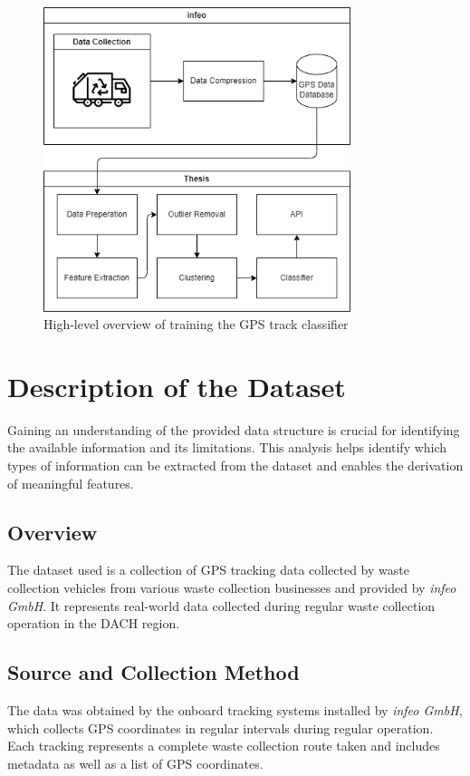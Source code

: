 \documentclass[a4paper,12pt,twoside]{scrreprt}
\begin{document}
\begin{figure}[htbp]
  \centering

  \includegraphics[width=0.8\textwidth]{Diagrams/drawio/big_picture.png}
  \caption{High-level overview of training the GPS track classifier}
  \label{fig:big_picture_diagram}
\end{figure}
\FloatBarrier

\section{Description of the Dataset}
Gaining an understanding of the provided data structure is crucial for
identifying the available information and its limitations.
This analysis helps identify which types of
information can be extracted from the dataset and enables the derivation of
meaningful features.

\subsection{Overview}
The dataset used is a collection of GPS tracking data collected by
waste collection vehicles from various waste collection businesses and provided
by \textit{infeo GmbH}. It represents real-world data
collected during regular waste collection operation in the DACH region.

\subsection{Source and Collection Method}
The data was obtained by the onboard tracking systems installed by
\textit{infeo GmbH},
which collects GPS coordinates in regular intervals during regular operation.
Each tracking represents a complete waste collection route taken and includes
metadata as well as a list of GPS coordinates.
\end{document}
